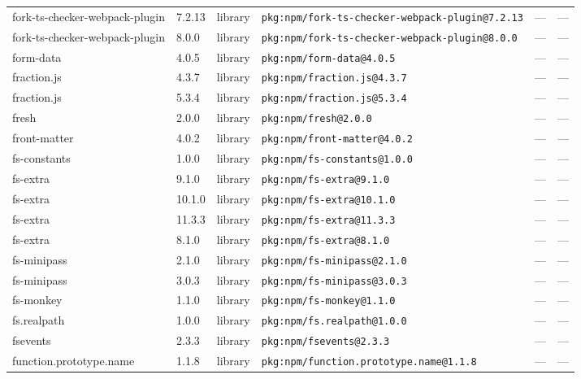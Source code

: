 \documentclass[11pt,a4paper]{article}
\begin{document}
\begin{longtable}{|p{4cm}|p{2cm}|p{1.6cm}|p{5cm}|p{1.5cm}|p{3.5cm}|}
\raggedright fork-ts-checker-webpack-plugin & 7.2.13 & library & \small\texttt{pkg:npm/fork-ts-checker-webpack-plugin@7.2.13} & — & \small — \\
\raggedright fork-ts-checker-webpack-plugin & 8.0.0 & library & \small\texttt{pkg:npm/fork-ts-checker-webpack-plugin@8.0.0} & — & \small — \\
\raggedright form-data & 4.0.5 & library & \small\texttt{pkg:npm/form-data@4.0.5} & — & \small — \\
\raggedright fraction.js & 4.3.7 & library & \small\texttt{pkg:npm/fraction.js@4.3.7} & — & \small — \\
\raggedright fraction.js & 5.3.4 & library & \small\texttt{pkg:npm/fraction.js@5.3.4} & — & \small — \\
\raggedright fresh & 2.0.0 & library & \small\texttt{pkg:npm/fresh@2.0.0} & — & \small — \\
\raggedright front-matter & 4.0.2 & library & \small\texttt{pkg:npm/front-matter@4.0.2} & — & \small — \\
\raggedright fs-constants & 1.0.0 & library & \small\texttt{pkg:npm/fs-constants@1.0.0} & — & \small — \\
\raggedright fs-extra & 9.1.0 & library & \small\texttt{pkg:npm/fs-extra@9.1.0} & — & \small — \\
\raggedright fs-extra & 10.1.0 & library & \small\texttt{pkg:npm/fs-extra@10.1.0} & — & \small — \\
\raggedright fs-extra & 11.3.3 & library & \small\texttt{pkg:npm/fs-extra@11.3.3} & — & \small — \\
\raggedright fs-extra & 8.1.0 & library & \small\texttt{pkg:npm/fs-extra@8.1.0} & — & \small — \\
\raggedright fs-minipass & 2.1.0 & library & \small\texttt{pkg:npm/fs-minipass@2.1.0} & — & \small — \\
\raggedright fs-minipass & 3.0.3 & library & \small\texttt{pkg:npm/fs-minipass@3.0.3} & — & \small — \\
\raggedright fs-monkey & 1.1.0 & library & \small\texttt{pkg:npm/fs-monkey@1.1.0} & — & \small — \\
\raggedright fs.realpath & 1.0.0 & library & \small\texttt{pkg:npm/fs.realpath@1.0.0} & — & \small — \\
\raggedright fsevents & 2.3.3 & library & \small\texttt{pkg:npm/fsevents@2.3.3} & — & \small — \\
\raggedright function.prototype.name & 1.1.8 & library & \small\texttt{pkg:npm/function.prototype.name@1.1.8} & — & \small — \\

\end{longtable}
\end{document}
